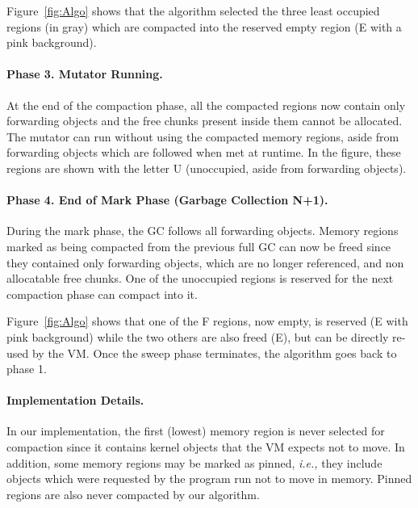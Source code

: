 \documentclass[sigplan,10pt,screen]{acmart}\settopmatter{printfolios=true,printccs=true,printacmref=true}
\newcommand{\egb}[1]{\color{blue}\fbox{\bfseries\sffamily\scriptsize Elisa:}{\sf\small$\blacktriangleright$\textit{#1}$\blacktriangleleft$}\color{black}}
\def\ie{\emph{i.e., }}
\begin{document}
Figure~\ref{fig:Algo} shows that the algorithm selected the three least occupied regions (in gray) which are compacted into the reserved empty region (E with a pink background).

\paragraph{Phase 3. Mutator Running.}  At the end of the compaction phase, all the compacted regions now contain only forwarding objects and the free chunks present inside them cannot be allocated. 
The mutator can run without using the compacted memory regions, aside from forwarding objects which are followed when met at runtime. In the figure, these regions are shown with the letter U (unoccupied, aside from forwarding objects).

\paragraph{Phase 4. End of Mark Phase (Garbage Collection N+1).} During the mark phase, the GC follows all forwarding objects. Memory regions marked as being compacted from the previous full GC can now be freed since they contained only forwarding objects, which are no longer referenced, and non allocatable free chunks. One of the unoccupied regions is reserved for the next compaction phase can compact into it.

Figure~\ref{fig:Algo} shows that one of the F regions, now empty, is reserved (E with pink background) while the two others are also freed (E), but can be directly re-used by the VM. Once the sweep phase terminates, the algorithm goes back to phase 1.

\paragraph{Implementation Details.}
In our implementation, the first (lowest) memory region is never selected for compaction since it contains kernel objects that the VM expects not to move. In addition, some memory regions may be marked as pinned, \ie they include objects which were requested by the program run not to move in memory. Pinned regions are also never compacted by our algorithm.%
\end{document}

